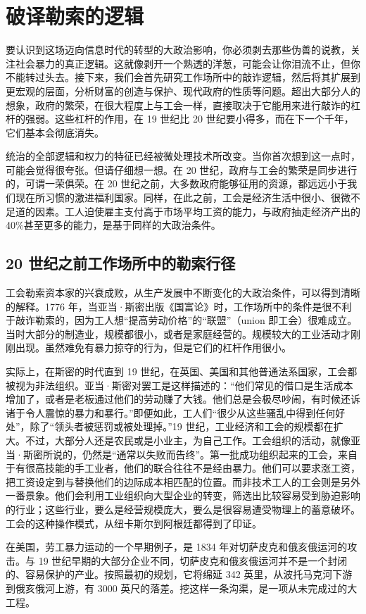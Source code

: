 \section{破译勒索的逻辑}
要认识到这场迈向信息时代的转型的大政治影响，你必须剥去那些伪善的说教，关注社会暴力的真正逻辑。这就像剥开一个熟透的洋葱，可能会让你泪流不止，但你不能转过头去。接下来，我们会首先研究工作场所中的敲诈逻辑，然后将其扩展到更宏观的层面，分析财富的创造与保护、现代政府的性质等问题。超出大部分人的想象，政府的繁荣，在很大程度上与工会一样，直接取决于它能用来进行敲诈的杠杆的强弱。这些杠杆的作用，在 19 世纪比 20 世纪要小得多，而在下一个千年，它们基本会彻底消失。

统治的全部逻辑和权力的特征已经被微处理技术所改变。当你首次想到这一点时，可能会觉得很夸张。但请仔细想一想。在 20 世纪，政府与工会的繁荣是同步进行的，可谓一荣俱荣。在 20 世纪之前，大多数政府能够征用的资源，都远远小于我们现在所习惯的激进福利国家。同样，在此之前，工会是经济生活中很小、很微不足道的因素。工人迫使雇主支付高于市场平均工资的能力，与政府抽走经济产出的 40\%甚至更多的能力，是基于同样的大政治条件。

\subsection{20 世纪之前工作场所中的勒索行径}
工会勒索资本家的兴衰成败，从生产发展中不断变化的大政治条件，可以得到清晰的解释。1776 年，当亚当·斯密出版《国富论》时，工作场所中的条件是很不利于敲诈勒索的，因为工人想“提高劳动价格”的“联盟”（union 即工会）很难成立。当时大部分的制造业，规模都很小，或者是家庭经营的。规模较大的工业活动才刚刚出现。虽然难免有暴力掠夺的行为，但是它们的杠杆作用很小。

实际上，在斯密的时代直到 19 世纪，在英国、美国和其他普通法系国家，工会都被视为非法组织。亚当·斯密对罢工是这样描述的：“他们常见的借口是生活成本增加了，或者是老板通过他们的劳动赚了大钱。他们总是会极尽吵闹，有时候还诉诸于令人震惊的暴力和暴行。”即便如此，工人们“很少从这些骚乱中得到任何好处”，除了“领头者被惩罚或被处理掉。”19 世纪，工业经济和工会的规模都在扩大。不过，大部分人还是农民或是小业主，为自己工作。工会组织的活动，就像亚当·斯密所说的，仍然是“通常以失败而告终”。第一批成功组织起来的工会，来自于有很高技能的手工业者，他们的联合往往不是经由暴力。他们可以要求涨工资，把工资设定到与替换他们的边际成本相匹配的位置。而非技术工人的工会则是另外一番景象。他们会利用工业组织向大型企业的转变，筛选出比较容易受到胁迫影响的行业；这些行业，要么是经营规模庞大，要么是很容易遭受物理上的蓄意破坏。工会的这种操作模式，从纽卡斯尔到阿根廷都得到了印证。

在美国，劳工暴力运动的一个早期例子，是 1834 年对切萨皮克和俄亥俄运河的攻击。与 19 世纪早期的大部分企业不同，切萨皮克和俄亥俄运河并不是一个封闭的、容易保护的产业。按照最初的规划，它将绵延 342 英里，从波托马克河下游到俄亥俄河上游，有 3000 英尺的落差。挖这样一条沟渠，是一项从未完成过的大工程。


